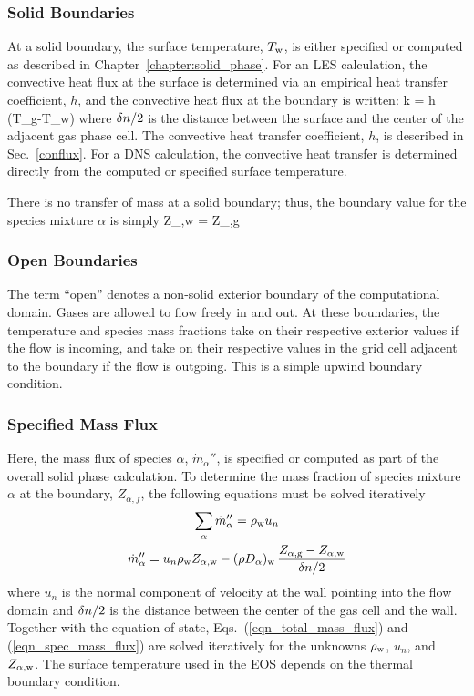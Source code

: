 \subsubsection{Solid Boundaries}

At a solid boundary, the surface temperature, $T_{\rm w}$, is either specified or computed as described in Chapter~\ref{chapter:solid_phase}. For an LES calculation, the convective heat flux at the surface is determined via an empirical heat transfer coefficient, $h$, and the convective heat flux at the boundary is written:
\be
   k  = h \; (T_{\rm g}-T_{\rm w})  \label{ebal}
\ee
where $\delta n/2$ is the distance between the surface and the center of the adjacent gas phase cell. The convective heat transfer coefficient, $h$, is described in Sec.~\ref{conflux}. For a DNS calculation, the convective heat transfer is determined directly from the computed or specified surface temperature.

There is no transfer of mass at a solid boundary; thus, the boundary value for the species mixture $\alpha$ is simply
\be Z_{\rm \alpha,w} = Z_{\rm \alpha,g} \ee

\subsubsection{Open Boundaries}

The term ``open'' denotes a non-solid exterior boundary of the computational domain. Gases are allowed to flow freely in and out. At these boundaries, the temperature and species mass fractions take on their respective exterior values if the flow is incoming, and take on their respective values in the grid cell adjacent to the boundary if the flow is outgoing. This is a simple upwind boundary condition.



\subsubsection{Specified Mass Flux}

Here, the mass flux of species $\alpha$, $\dot{m}_\alpha''$, is specified or computed as part of the overall solid phase calculation. To determine the mass fraction of species mixture $\alpha$ at the boundary, $Z_{\alpha,f}$, the following equations must be solved iteratively
\begin{gather}
\label{eqn_total_mass_flux} \sum_\alpha \dot{m}_\alpha'' = \rho_{\rm w} u_n \\
\label{eqn_spec_mass_flux}  \dot{m}_\alpha'' = u_n \rho_{\rm w} Z_{\rm \alpha,w} - (\rho D_\alpha)_{\rm w} \, \frac{Z_{\rm \alpha,g}-Z_{\rm \alpha,w}}{\delta n/2}
\end{gather}
where $u_n$ is the normal component of velocity at the wall pointing into the flow domain and $\delta n/2$ is the distance between the center of the gas cell and the wall. Together with the equation of state, Eqs.~(\ref{eqn_total_mass_flux}) and (\ref{eqn_spec_mass_flux}) are solved iteratively for the unknowns $\rho_{\rm w}$, $u_n$, and $Z_{\rm \alpha,w}$.  The surface temperature used in the EOS depends on the thermal boundary condition.


